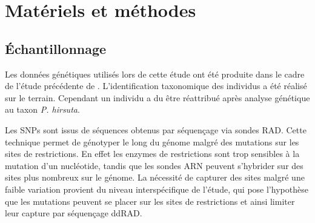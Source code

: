 \documentclass[12pt,a4paper,notitlepage]{article}
\begin{document}
\lipsum[1-2]


%
\section{Matériels et méthodes}

\subsection{Échantillonnage}

Les données génétiques utilisés lors de cette étude ont été produite dans le cadre de l'étude précédente de \citet{Boucher2016a}. L'identification taxonomique des individus a été réalisé sur le terrain. Cependant un individu a du être réattribué après analyse génétique au taxon \textit{P. hirsuta}.

Les SNPs sont issus de séquences obtenus par séquençage via sondes RAD. Cette technique permet de génotyper le long du génome malgré des mutations sur les sites de restrictions. En effet les enzymes de restrictions sont trop sensibles à la mutation d'un nucléotide, tandis que les sondes ARN peuvent s'hybrider sur des sites plus nombreux sur le génome. La nécessité de capturer des sites malgré une faible variation provient du niveau interspécifique de l'étude, qui pose l'hypothèse que les mutations peuvent se placer sur les sites de restrictions et ainsi limiter leur capture par séquençage ddRAD.

\end{document}

